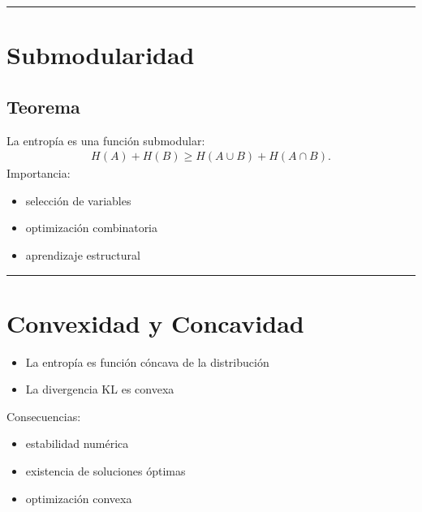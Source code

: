 \documentclass[letterpaper,10pt,english]{jupyterBook}
\begin{document}
\bigskip\hrule\bigskip



\section{Submodularidad}
\label{\detokenize{02_mathematical_foundations/properties_theorems:submodularidad}}

\subsection{Teorema}
\label{\detokenize{02_mathematical_foundations/properties_theorems:id14}}
\sphinxAtStartPar
La entropía es una función submodular:
\begin{equation*}
\begin{split}
H(A)+H(B)\ge H(A\cup B)+H(A\cap B).
\end{split}
\end{equation*}
\sphinxAtStartPar
Importancia:
\begin{itemize}
\item {} 
\sphinxAtStartPar
selección de variables

\item {} 
\sphinxAtStartPar
optimización combinatoria

\item {} 
\sphinxAtStartPar
aprendizaje estructural

\end{itemize}


\bigskip\hrule\bigskip



\section{Convexidad y Concavidad}
\label{\detokenize{02_mathematical_foundations/properties_theorems:convexidad-y-concavidad}}\begin{itemize}
\item {} 
\sphinxAtStartPar
La entropía es función cóncava de la distribución

\item {} 
\sphinxAtStartPar
La divergencia KL es convexa

\end{itemize}

\sphinxAtStartPar
Consecuencias:
\begin{itemize}
\item {} 
\sphinxAtStartPar
estabilidad numérica

\item {} 
\sphinxAtStartPar
existencia de soluciones óptimas

\item {} 
\sphinxAtStartPar
optimización convexa

\end{itemize}
\end{document}
